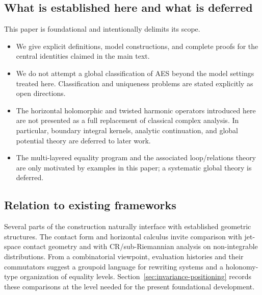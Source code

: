 \subsection{What is established here and what is deferred}\label{subsec:intro-scope}

This paper is foundational and intentionally delimits its scope.

\begin{itemize}
    \item We give explicit definitions, model constructions, and complete proofs for the central identities claimed in the main text.
    \item We do not attempt a global classification of AES beyond the model settings treated here. Classification and uniqueness problems are stated explicitly as open directions.
    \item The horizontal holomorphic and twisted harmonic operators introduced here are not presented as a full replacement of classical complex analysis. In particular, boundary integral kernels, analytic continuation, and global potential theory are deferred to later work.
    \item The multi-layered equality program and the associated loop/relations theory are only motivated by examples in this paper; a systematic global theory is deferred.
\end{itemize}

\subsection{Relation to existing frameworks}\label{subsec:intro-related}

Several parts of the construction naturally interface with established geometric structures. The contact form and horizontal calculus invite comparison with jet-space contact geometry and with CR/sub-Riemannian analysis on non-integrable distributions. From a combinatorial viewpoint, evaluation histories and their commutators suggest a groupoid language for rewriting systems and a holonomy-type organization of equality levels. Section~\ref{sec:invariance-positioning} records these comparisons at the level needed for the present foundational development.
